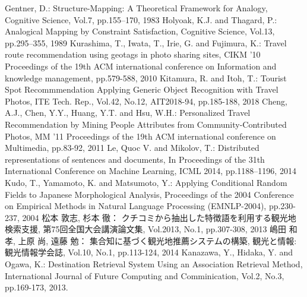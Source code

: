 \documentclass[submit]{ipsj}
\begin{document}
\begin{thebibliography}{11}
    Gentner, D.:
      Structure-Mapping: A Theoretical Framework for Analogy,
      Cognitive Science, Vol.7, pp.155–170, 1983
    Holyoak, K.J. and Thagard, P.:
      Analogical Mapping by Constraint Satisfaction,
      Cognitive Science, Vol.13, pp.295–355, 1989
    Kurashima, T., Iwata, T., Irie, G. and Fujimura, K.:
      Travel route recommendation using geotags in photo sharing sites,
      CIKM '10 Proceedings of the 19th ACM international conference on Information and knowledge management, pp.579-588, 2010
    Kitamura, R. and Itoh, T.:
      Tourist Spot Recommmendation Applying Generic Object Recognition with Travel Photos,
      ITE Tech. Rep., Vol.42, No.12, AIT2018-94, pp.185-188, 2018
    Cheng, A.J., Chen, Y.Y., Huang, Y.T. and Hsu, W.H.:
      Personalized Travel Recommendation by Mining People Attributes from Community-Contributed Photos,
      MM '11 Proceedings of the 19th ACM international conference on Multimedia, pp.83-92, 2011
    Le, Quoc V. and Mikolov, T.:
      Distributed representations of sentences and documents,
      In Proceedings of the 31th International Conference on Machine Learning, ICML 2014, pp.1188–1196, 2014
    Kudo, T., Yamamoto, K. and Matsumoto, Y.:
      Applying Conditional Random Fields to Japanese Morphological Analysis,
      Proceedings of the 2004 Conference on Empirical Methods in Natural Language Processing (EMNLP-2004), pp.230-237, 2004
    松本 敦志, 杉本 徹：
      クチコミから抽出した特徴語を利用する観光地検索支援,
      第75回全国大会講演論文集, Vol.2013, No.1, pp.307-308, 2013
    嶋田 和孝, 上原 尚, 遠藤 勉：
      集合知に基づく観光地推薦システムの構築,
      観光と情報:観光情報学会誌, Vol.10, No.1, pp.113-124, 2014
    Kanazawa, Y., Hidaka, Y. and Ogawa, K.:
      Destination Retrieval System Using an Association Retrieval Method, International Journal of Future Computing and Comminication, Vol.2, No.3, pp.169-173, 2013.

\end{thebibliography}

\begin{biography}
%
\end{biography}
\end{document}
